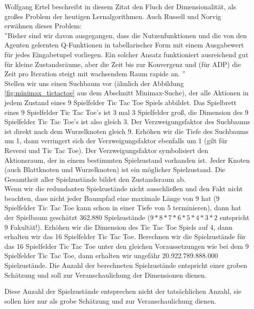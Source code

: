 Wolfgang Ertel beschreibt in diesem Zitat den Fluch der Dimensionalität, als großes Problem der heutigen Lernalgorithmen. Auch Russell und Norvig erwähnen dieses Problem:\\

''Bisher sind wir davon ausgegangen, dass die Nutzenfunktionen und die von den Agenten gelernten Q-Funktionen in tabellarischer Form mit einem Ausgabewert für jedes Eingabetupel vorliegen. Ein solcher Ansatz funktioniert ausreichend gut für kleine Zustandsräume, aber die Zeit bis zur Konvergenz und (für ADP) die Zeit pro Iteration steigt mit wachsendem Raum rapide an. \cite[975]{Russell}''\\

Stellen wir uns einen Suchbaum vor (ähnlich der Abbildung \ref{fig:minimax_tictactoe} aus dem Abschnitt Minimax-Suche), der alle Aktionen in jedem Zustand eines 9 Spielfelder Tic Tac Toe Spiels abbildet. Das Spielbrett eines 9 Spielfelder Tic Tac Toe's ist 3 mal 3 Spielfelder groß, die Dimension des 9 Spielfelder Tic Tac Toe's ist also gleich 3. Der Verzweigungsfaktor des Suchbaums ist direkt nach dem Wurzelknoten gleich 9. Erhöhen wir die Tiefe des Suchbaums um 1, dann verringert sich der Verzweigungsfaktor ebenfalls um 1 (gilt für Reversi und Tic Tac Toe). Der Verzweigungsfaktor symbolisiert den Aktionsraum, der in einem bestimmten Spielzustand vorhanden ist. Jeder Knoten (auch Blattknoten und Wurzelknoten) ist ein möglicher Spielzustand. Die Gesamtheit aller Spielzustände bildet den Zustandsraum ab. \\

Wenn wir die redundanten Spielzustände nicht ausschließen und den Fakt nicht beachten, dass nicht jeder Baumpfad eine maximale Länge von 9 hat (9 Spielfelder Tic Tac Toe kann schon in einer Tiefe von 5 terminieren), dann hat der Spielbaum geschätzt 362.880 Spielzustände ($9 * 8 * 7 * 6 * 5 * 4 * 3 * 2$ entspricht 9 Fakultät!). Erhöhen wir die Dimension des Tic Tac Toe Spiels auf 4, dann erhalten wir das 16 Spielfelder Tic Tac Toe. Berechnen wir die Spielzustände für das 16 Spielfelder Tic Tac Toe unter den gleichen Voraussetzungen wie bei dem 9 Spielfelder Tic Tac Toe, dann erhalten wir ungefähr 20.922.789.888.000 Spielzustände. Die Anzahl der berechneten Spielzustände entspricht einer groben Schätzung und soll zur Veranschaulichung der Dimensionen dienen.

Diese Anzahl der Spielzustände entsprechen nicht der tatsächlichen Anzahl, sie sollen hier nur als grobe Schätzung und zur Veranschaulichung dienen. \\

